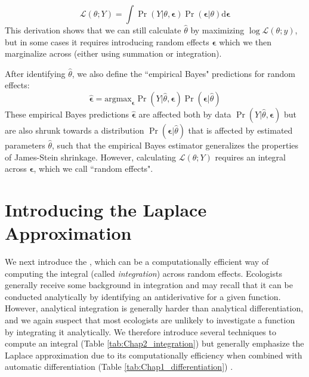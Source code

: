 \begin{equation}
    \mathcal{L}( \theta; Y ) = \int \Pr(Y | \theta, \mathbf{\epsilon}) \Pr( \mathbf{\epsilon} | \theta) \mathrm{d} \mathbf{\epsilon}
\end{equation}
This derivation shows that we can still calculate \( \hat{\theta} \) by maximizing \( \log \mathcal{L}( \theta; y ) \), but in some cases it requires introducing random effects \(\mathbf{\epsilon}\) which we then marginalize across (either using summation or integration).  

After identifying \( \hat{\theta} \), we also define the ``empirical Bayes" predictions for random effects:
\begin{equation} \label{eq:Chap2_empirical_bayes}
    \hat{\mathbf{\epsilon}} = \mathrm{argmax}_{\mathbf{\epsilon}} \Pr(Y | \hat{\theta}, \mathbf{\epsilon}) \Pr( \mathbf{\epsilon} | \hat{\theta})
\end{equation}
These empirical Bayes predictions \( \hat{\mathbf{\epsilon}} \) are affected both by data \( \Pr(Y | \hat{\theta}, \mathbf{\epsilon}) \) but are also shrunk towards a distribution \( \Pr( \mathbf{\epsilon} | \hat{\theta}) \) that is affected by estimated parameters \(\hat{\theta}\), such that the empirical Bayes estimator generalizes the properties of James-Stein shrinkage. However, calculating \( \mathcal{L}( \theta; Y ) \) requires an integral across \( \mathbf{\epsilon} \), which we call ``random effects". 

\section{Introducing the Laplace Approximation} \label{sec:Chap2_Laplace}

We next introduce the , which can be a computationally efficient way of computing the integral (called \textit{integration}) across random effects.  Ecologists generally receive some background in integration and may recall that it can be conducted analytically by identifying an antiderivative for a given function.  However, analytical integration is generally harder than analytical differentiation, and we again suspect that most ecologists are unlikely to investigate a function by integrating it analytically.  We therefore introduce several techniques to compute an integral (Table \ref{tab:Chap2_integration}) but generally emphasize the Laplace approximation due to its computationally efficiency when combined with automatic differentiation (Table \ref{tab:Chap1_differentiation}) \cite{skaug_automatic_2006}.

